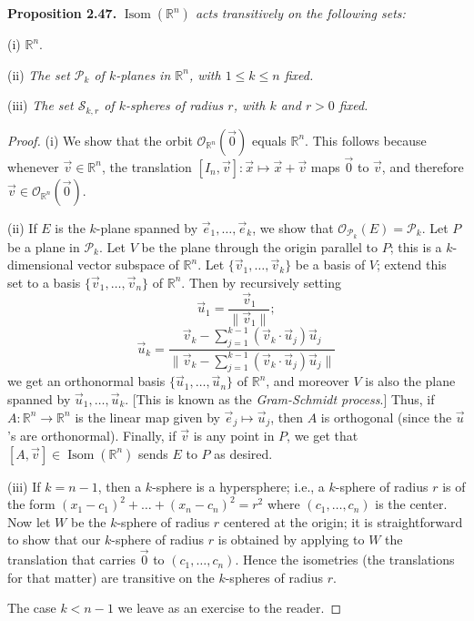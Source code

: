\documentclass[leqno]{book}
\begin{document}
\noindent\textbf{Proposition 2.47.} \emph{$\operatorname{Isom}(\mathbb R^n)$ acts transitively on the following sets:} %

(i) $\mathbb R^n$.

(ii) \emph{The set $\mathcal P_k$ of $k$-planes in $\mathbb R^n$, with $1\leqslant k\leqslant n$ fixed.}

(iii) \emph{The set $\mathcal S_{k,r}$ of $k$-spheres of radius $r$, with $k$ and $r>0$ fixed.}
\begin{proof}
(i) We show that the orbit $\mathcal O_{\mathbb R^n}(\vec 0)$ equals $\mathbb R^n$.  This follows because whenever $\vec v\in\mathbb R^n$, the translation $[I_n,\vec v]:\vec x\mapsto\vec x+\vec v$ maps $\vec 0$ to $\vec v$, and therefore $\vec v\in\mathcal O_{\mathbb R^n}(\vec 0)$.

(ii) If $E$ is the $k$-plane spanned by $\vec e_1,\dots,\vec e_k$, we show that $\mathcal O_{\mathcal P_k}(E)=\mathcal P_k$.  Let $P$ be a plane in $\mathcal P_k$.  Let $V$ be the plane through the origin parallel to $P$; this is a $k$-dimensional vector subspace of $\mathbb R^n$.  Let $\{\vec v_1,\dots,\vec v_k\}$ be a basis of $V$; extend this set to a basis $\{\vec v_1,\dots,\vec v_n\}$ of $\mathbb R^n$.  Then by recursively setting
$$\vec u_1=\frac{\vec v_1}{\|\vec v_1\|};$$
$$\vec u_k=\frac{\vec v_k-\sum_{j=1}^{k-1}(\vec v_k\cdot\vec u_j)\vec u_j}{\|\vec v_k-\sum_{j=1}^{k-1}(\vec v_k\cdot\vec u_j)\vec u_j\|}$$
we get an orthonormal basis $\{\vec u_1,\dots,\vec u_n\}$ of $\mathbb R^n$, and moreover $V$ is also the plane spanned by $\vec u_1,\dots,\vec u_k$.  [This is known as the \emph{Gram-Schmidt process}.]  Thus, if $A:\mathbb R^n\to\mathbb R^n$ is the linear map given by $\vec e_j\mapsto\vec u_j$, then $A$ is orthogonal (since the $\vec u$'s are orthonormal).  Finally, if $\vec v$ is any point in $P$, we get that $[A,\vec v]\in\operatorname{Isom}(\mathbb R^n)$ sends $E$ to $P$ as desired.

(iii) If $k=n-1$, then a $k$-sphere is a hypersphere; i.e., a $k$-sphere of radius $r$ is of the form $(x_1-c_1)^2+\dots+(x_n-c_n)^2=r^2$ where $(c_1,\dots,c_n)$ is the center.  Now let $W$ be the $k$-sphere of radius $r$ centered at the origin; it is straightforward to show that our $k$-sphere of radius $r$ is obtained by applying to $W$ the translation that carries $\vec 0$ to $(c_1,\dots,c_n)$.  Hence the isometries (the translations for that matter) are transitive on the $k$-spheres of radius $r$.

The case $k<n-1$ we leave as an exercise to the reader.
\end{proof}
\end{document}
